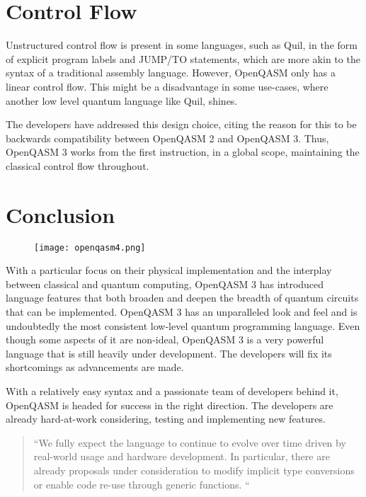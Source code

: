 \documentclass[conference]{IEEEtran}
\begin{document}
\section*{\textbf{Control Flow}}
Unstructured control flow is present in some languages, such as Quil, in the form of explicit program labels and JUMP/TO statements, which are more akin to the syntax of a traditional assembly language. However, OpenQASM only has a linear control flow. This might be a disadvantage in some use-cases, where another low level quantum language like Quil, shines. 

The developers have addressed this design choice, citing the reason for this to be backwards compatibility between OpenQASM 2 and OpenQASM 3. Thus, OpenQASM 3 works from the first instruction, in a global scope, maintaining the classical control flow throughout. \cite{b3}

\section{\textbf{Conclusion}}
\begin{figure}[H]
\centering
\centerline{\texttt{[image: openqasm4.png]}}
\end{figure}

With a particular focus on their physical implementation and the interplay between classical and quantum computing, OpenQASM 3 has introduced language features that both broaden and deepen the breadth of quantum circuits that can be implemented. OpenQASM 3 has an unparalleled look and feel and is undoubtedly the most consistent low-level quantum programming language. Even though some aspects of it are non-ideal, OpenQASM 3 is a very powerful language that is still heavily under development. The developers will fix its shortcomings as advancements are made. 

With a relatively easy syntax and a passionate team of developers behind it, OpenQASM is headed for success in the right direction. The developers are already hard-at-work considering, testing and implementing new features.

\begin{quote}
    ``We fully expect the language to continue to evolve over time driven by real-world usage and hardware development. In particular, there are already proposals under consideration to modify implicit type conversions or enable code re-use through generic functions. \cite{b3}``
\end{quote}
\end{document}
